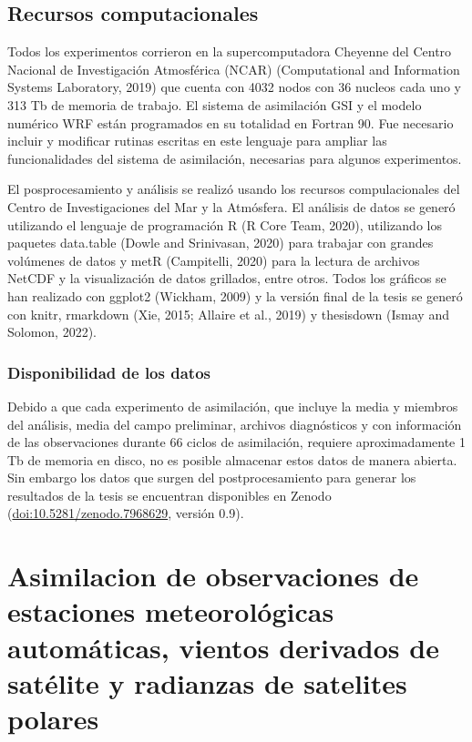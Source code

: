 \documentclass[12pt,oneside,a4paper]{reedthesis}
\begin{document}
\hypertarget{recursos-computacionales}{%
\section{Recursos computacionales}\label{recursos-computacionales}}

Todos los experimentos corrieron en la supercomputadora Cheyenne del Centro Nacional de Investigación Atmosférica (NCAR) (Computational and Information Systems Laboratory, 2019) que cuenta con 4032 nodos con 36 nucleos cada uno y 313 Tb de memoria de trabajo. El sistema de asimilación GSI y el modelo numérico WRF están programados en su totalidad en Fortran 90. Fue necesario incluir y modificar rutinas escritas en este lenguaje para ampliar las funcionalidades del sistema de asimilación, necesarias para algunos experimentos.

El posprocesamiento y análisis se realizó usando los recursos compulacionales del Centro de Investigaciones del Mar y la Atmósfera. El análisis de datos se generó utilizando el lenguaje de programación R (R Core Team, 2020), utilizando los paquetes data.table (Dowle and Srinivasan, 2020) para trabajar con grandes volúmenes de datos y metR (Campitelli, 2020) para la lectura de archivos NetCDF y la visualización de datos grillados, entre otros.
Todos los gráficos se han realizado con ggplot2 (Wickham, 2009) y la versión final de la tesis se generó con knitr, rmarkdown (Xie, 2015; Allaire et al., 2019) y thesisdown (Ismay and Solomon, 2022).

\hypertarget{disponibilidad-de-los-datos}{%
\subsection{Disponibilidad de los datos}\label{disponibilidad-de-los-datos}}

Debido a que cada experimento de asimilación, que incluye la media y miembros del análisis, media del campo preliminar, archivos diagnósticos y con información de las observaciones durante 66 ciclos de asimilación, requiere aproximadamente 1 Tb de memoria en disco, no es posible almacenar estos datos de manera abierta. Sin embargo los datos que surgen del postprocesamiento para generar los resultados de la tesis se encuentran disponibles en Zenodo (\url{doi:10.5281/zenodo.7968629}, versión 0.9).

\hypertarget{ch1}{%
\chapter{Asimilacion de observaciones de estaciones meteorológicas automáticas, vientos derivados de satélite y radianzas de satelites polares}\label{ch1}}
\end{document}
